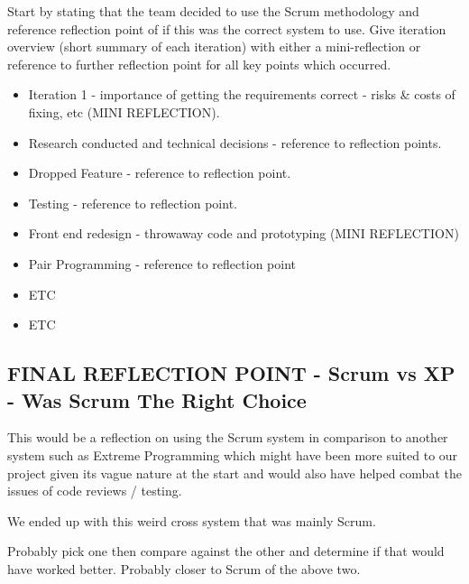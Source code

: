 \documentclass{l3proj}
\begin{document}
Start by stating that the team decided to use the Scrum methodology and reference reflection point of if this was the correct system to use. Give iteration overview (short summary of each iteration) with either a mini-reflection or reference to further reflection point for all key points which occurred.
\begin{itemize}
\item Iteration 1 - importance of getting the requirements correct - risks \& costs of fixing, etc (MINI REFLECTION).
\item Research conducted and technical decisions - reference to reflection points.
\item Dropped Feature - reference to reflection point.
\item Testing - reference to reflection point.
\item Front end redesign - throwaway code and prototyping (MINI REFLECTION)
\item Pair Programming - reference to reflection point 
\item ETC
\item ETC
\end{itemize}

\subsection{FINAL REFLECTION POINT - Scrum vs XP - Was Scrum The Right Choice}
\label{sec:scrumvsxp}
This would be a reflection on using the Scrum system in comparison to another system such as Extreme Programming which might have been more suited to our project given its vague nature at the start and would also have helped combat the issues of code reviews / testing.

We ended up with this weird cross system that was mainly Scrum.

Probably pick one then compare against the other and determine if that would have worked better. Probably closer to Scrum of the above two.
\end{document}
